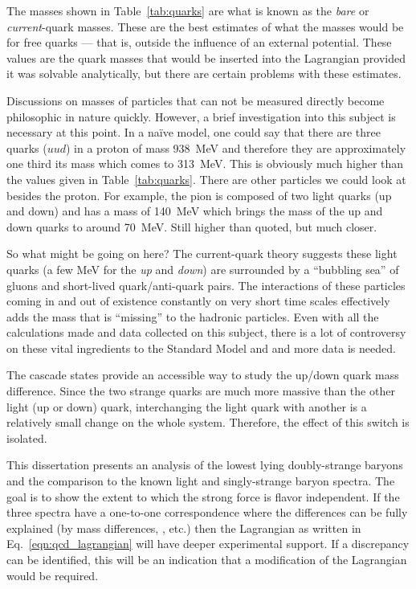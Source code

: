 The masses shown in Table~\ref{tab:quarks} are what is known as the \emph{bare} or \emph{current}-quark masses. These are the best estimates of what the masses would be for free quarks --- that is, outside the influence of an external  potential. These values are the quark masses that would be inserted into the  Lagrangian provided it was solvable analytically, but there are certain problems with these estimates.

Discussions on masses of particles that can not be measured directly become philosophic in nature quickly. However, a brief investigation into this subject is necessary at this point. In a na\"ive model, one could say that there are three quarks ($uud$) in a proton of mass 938~MeV and therefore they are approximately one third its mass which comes to 313~MeV. This is obviously much higher than the values given in Table~\ref{tab:quarks}. There are other particles we could look at besides the proton. For example, the pion is composed of two light quarks (up and down) and has a mass of 140~MeV which brings the mass of the up and down quarks to around 70~MeV. Still higher than quoted, but much closer.

So what might be going on here? The current-quark theory suggests these light quarks (a few MeV for the \emph{up} and \emph{down}) are surrounded by a ``bubbling sea'' of gluons and short-lived quark/anti-quark pairs. The interactions of these particles coming in and out of existence constantly on very short time scales effectively adds the mass that is ``missing'' to the hadronic particles. Even with all the calculations made and data collected on this subject\cite{pdg}, there is a lot of controversy on these vital ingredients to the Standard Model and  and more data is needed.

The cascade states provide an accessible way to study the up/down quark mass difference. Since the two strange quarks are much more massive than the other light (up or down) quark, interchanging the light quark with another is a relatively small change on the whole system. Therefore, the effect of this switch is isolated.

This dissertation presents an analysis of the lowest lying doubly-strange baryons and the comparison to the known light and singly-strange baryon spectra. The goal is to show the extent to which the strong force is flavor independent. If the three spectra have a one-to-one correspondence where the differences can be fully explained (by mass differences, , etc.) then the  Lagrangian as written in Eq.~\ref{eqn:qcd_lagrangian} will have deeper experimental support. If a discrepancy can be identified, this will be an indication that a modification of the  Lagrangian would be required.

\setcounter{secnumdepth}{2}






